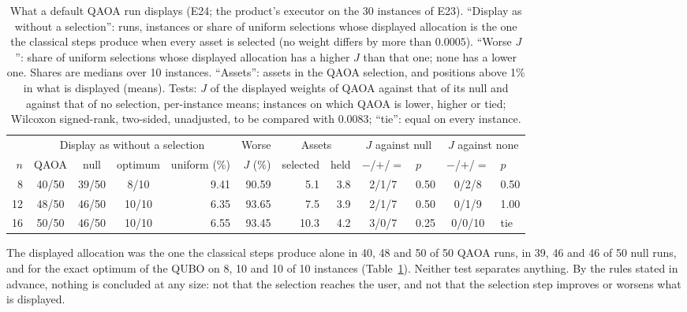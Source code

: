 \documentclass[11pt,a4paper]{article}
\begin{document}
\begin{table}[H]
\centering\footnotesize\setlength{\tabcolsep}{3pt}
\begin{tabular}{rcccrrrrclcl}
\toprule
 & \multicolumn{4}{c}{Display as without a selection} & Worse & \multicolumn{2}{c}{Assets} & \multicolumn{2}{c}{$J$ against null} & \multicolumn{2}{c}{$J$ against none} \\
$n$ & QAOA & null & optimum & uniform (\%) & $J$ (\%) & selected & held & $-$/$+$/$=$ & $p$ & $-$/$+$/$=$ & $p$ \\
\midrule
8 & 40/50 & 39/50 & 8/10 & 9.41 & 90.59 & 5.1 & 3.8 & 2/1/7 & 0.50 & 0/2/8 & 0.50 \\
12 & 48/50 & 46/50 & 10/10 & 6.35 & 93.65 & 7.5 & 3.9 & 2/1/7 & 0.50 & 0/1/9 & 1.00 \\
16 & 50/50 & 46/50 & 10/10 & 6.55 & 93.45 & 10.3 & 4.2 & 3/0/7 & 0.25 & 0/0/10 & tie \\
\bottomrule
\end{tabular}
\caption{What a default QAOA run displays (E24; the product's executor on the
30 instances of E23). ``Display as without a selection'': runs, instances or
share of uniform selections whose displayed allocation is the one the
classical steps produce when every asset is selected (no weight differs by
more than $0.0005$). ``Worse $J$'': share of uniform selections whose
displayed allocation has a higher $J$ than that one; none has a lower one.
Shares are medians over 10 instances. ``Assets'': assets in the QAOA
selection, and positions above 1\% in what is displayed (means). Tests: $J$
of the displayed weights of QAOA against that of its null and against that
of no selection, per-instance means; instances on which QAOA is lower,
higher or tied; Wilcoxon signed-rank, two-sided, unadjusted, to be compared
with $0.0083$; ``tie'': equal on every instance.}
\label{tab:displayed}
\end{table}

The displayed allocation was the one the classical steps produce alone in
40, 48 and 50 of 50 QAOA runs, in 39, 46 and 46 of 50 null runs, and for the
exact optimum of the QUBO on 8, 10 and 10 of 10 instances
(Table~\ref{tab:displayed}). Neither test separates anything. By the rules
stated in advance, nothing is concluded at any size: not that the selection
reaches the user, and not that the selection step improves or worsens what
is displayed.
\end{document}
